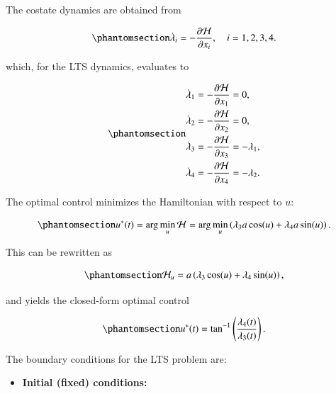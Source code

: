 \documentclass[
  number,
  preprint]{elsarticle}
\providecommand{\tightlist}{%
  \setlength{\itemsep}{0pt}\setlength{\parskip}{0pt}}
\begin{document}
The costate dynamics are obtained from

\begin{equation}\protect\phantomsection\label{eq-ch3-lts-costate-general}{
\dot{\lambda}_i = -\frac{\partial \mathcal{H}}{\partial x_i}, \quad i = 1,2,3,4.
}\end{equation}

which, for the LTS dynamics, evaluates to

\begin{equation}\protect\phantomsection\label{eq-ch3-lts-costate}{
\begin{aligned}
\dot{\lambda}_1 &= -\frac{\partial \mathcal{H}}{\partial x_1} = 0, \\
\dot{\lambda}_2 &= -\frac{\partial \mathcal{H}}{\partial x_2} = 0, \\
\dot{\lambda}_3 &= -\frac{\partial \mathcal{H}}{\partial x_3} = -\lambda_1, \\
\dot{\lambda}_4 &= -\frac{\partial \mathcal{H}}{\partial x_4} = -\lambda_2.
\end{aligned}
}\end{equation}

The optimal control minimizes the Hamiltonian with respect to \(u\):

\begin{equation}\protect\phantomsection\label{eq-ch3-lts-optimal-control}{
u^*(t) = \arg\min_u \mathcal{H} = \arg\min_u \left( \lambda_3 a \cos(u) + \lambda_4 a \sin(u) \right).
}\end{equation}

This can be rewritten as

\begin{equation}\protect\phantomsection\label{eq-ch3-lts-hu}{
\mathcal{H}_{u} = a \left( \lambda_3 \cos(u) + \lambda_4 \sin(u) \right),
}\end{equation}

and yields the closed-form optimal control

\begin{equation}\protect\phantomsection\label{eq-ch3-lts-u-optimal}{
u^*(t) = \tan^{-1}\left( \frac{\lambda_4(t)}{\lambda_3(t)} \right).
}\end{equation}

The boundary conditions for the LTS problem are:

\begin{itemize}
\tightlist
\item
  \textbf{Initial (fixed) conditions:}
\end{itemize}
\end{document}
